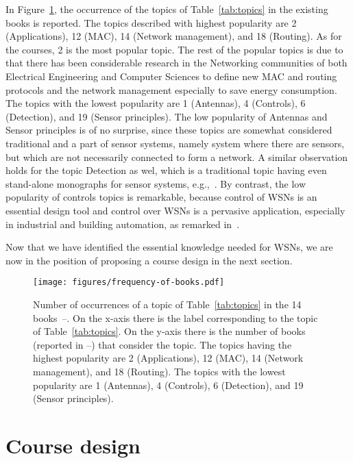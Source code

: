 \documentclass[onecolumn,12pt,draftclsnofoot,a4paper,peerreview]{IEEEtran}
\begin{document}
In Figure~\ref{fig:frequency-book-topics}, the occurrence of the topics of Table~\ref{tab:topics} in the existing books is reported. The topics described with highest popularity are 2 (Applications), 12 (MAC), 14 (Network management), and 18 (Routing). As for the courses, 2 is the most popular topic. The rest of the popular topics is due to that there has been considerable research in the Networking communities of both Electrical Engineering and Computer Sciences to define new MAC and routing protocols and the network management especially to save energy consumption. The topics with the lowest popularity are 1 (Antennas), 4 (Controls), 6 (Detection), and 19 (Sensor principles). The low popularity of Antennas and Sensor principles is of no surprise, since these topics are somewhat considered traditional and a part of sensor systems, namely system where there are sensors, but which are not necessarily connected to form a network. A similar observation holds for the topic Detection as wel, which is a traditional topic having even stand-alone monographs for sensor systems, e.g.,~\cite{Varshney97,Gustafsson12}. By contrast, the low popularity of controls topics is remarkable, because control of WSNs is an essential design tool and control over WSNs is a pervasive application, especially in industrial and building automation, as remarked in~\cite{Rollins11}.  

Now that we have identified the essential knowledge needed for WSNs, we are now in the position of proposing a course design in the next section. 



\begin{figure}[t]
\centering
\texttt{[image: figures/frequency-of-books.pdf]}
\caption{Number of occurrences of a topic of Table~\ref{tab:topics} in the 14 books~\cite{ZhaoGuibas04}--\cite{WagnerWattenhofer10}. On the x-axis there is the label corresponding to the topic of Table~\ref{tab:topics}. On the y-axis there is the number of books (reported in \cite{ZhaoGuibas04}--\cite{WagnerWattenhofer10}) that consider the topic. The topics having the highest popularity are 2 (Applications), 12 (MAC), 14 (Network management), and 18 (Routing). The topics with the lowest popularity are 1 (Antennas), 4 (Controls), 6 (Detection), and 19 (Sensor principles).}
\label{fig:frequency-book-topics}
\end{figure}


\section{Course design} \label{course design}
\end{document}
